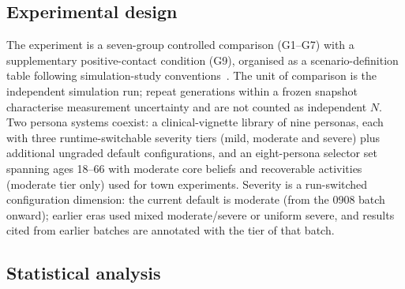 \documentclass[sn-nature,pdflatex]{sn-jnl}
\begin{document}
\subsection*{Experimental design}

The experiment is a seven-group controlled comparison (G1--G7) with a supplementary positive-contact condition (G9), organised as a scenario-definition table following simulation-study conventions~\cite{crosland2025}. The unit of comparison is the independent simulation run; repeat generations within a frozen snapshot characterise measurement uncertainty and are not counted as independent $N$. Two persona systems coexist: a clinical-vignette library of nine personas, each with three runtime-switchable severity tiers (mild, moderate and severe) plus additional ungraded default configurations, and an eight-persona selector set spanning ages 18--66 with moderate core beliefs and recoverable activities (moderate tier only) used for town experiments. Severity is a run-switched configuration dimension: the current default is moderate (from the 0908 batch onward); earlier eras used mixed moderate/severe or uniform severe, and results cited from earlier batches are annotated with the tier of that batch.

\subsection*{Statistical analysis}
\end{document}
